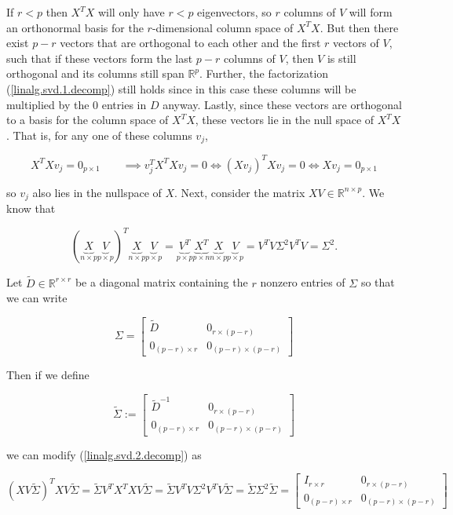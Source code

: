 If \(r < p\) then \(X^TX\) will only have \(r < p\) eigenvectors, so \(r\) columns of \(V\) will form an orthonormal basis for the \(r\)-dimensional column space of \(X^TX\). But then there exist \(p - r\) vectors that are orthogonal to each other and the first \(r\) vectors of \(V\), such that if these vectors form the last \(p-r\) columns of \(V\), then \(V\) is still orthogonal and its columns still span \(\mathbb{R}^p\). Further, the factorization (\ref{linalg.svd.1.decomp}) still holds since in this case these columns will be multiplied by the 0 entries in \(D\) anyway. Lastly, since these vectors are orthogonal to a basis for the column space of \(X^TX\), these vectors lie in the null space of \(X^TX\). That is, for any one of these columns \(v_j\),

\[
X^TX v_j = 0_{p \times 1} \qquad \implies v_j^T X^T X v_j = 0  \iff (X v_j )^T Xv _j = 0 \iff Xv _j  = 0_{p \times 1} 
\]

so \(v_j\) also lies in the nullspace of \(X\). Next, consider the matrix \(XV \in \mathbb{R}^{n \times p}\). We know that

\begin{equation}\label{linalg.svd.2.decomp}
(\underbrace{X}_{n \times p} \underbrace{V}_{p \times p})^T \underbrace{X}_{n \times p} \underbrace{V}_{p \times p} = \underbrace{V^T}_{p \times p} \underbrace{X^T}_{p \times n}  \underbrace{X}_{n \times p} \underbrace{V}_{p \times p} =  V^T V \Sigma^2 V^TV = \Sigma^2.
\end{equation}

Let \(\tilde{D} \in \mathbb{R}^{r \times r} \) be a diagonal matrix containing the \(r\) nonzero entries of \(\Sigma\) so that we can write

\[
\Sigma = \begin{bmatrix} 
\tilde{D} & 0_{r \times (p - r)} \\
0_{(p-r) \times r}  & 0_{(p-r) \times (p-r)}
\end{bmatrix}
\]

Then if we define

\[
\tilde{\Sigma} :=  \begin{bmatrix} 
\tilde{D}^{-1} & 0_{r \times (p - r)} \\
0_{(p-r) \times r}  & 0_{(p-r) \times (p-r)}
\end{bmatrix}
\]

we can modify (\ref{linalg.svd.2.decomp}) as

\begin{equation}\label{linalg.svd.3.decomp}
(XV \tilde{\Sigma})^T XV \tilde{\Sigma} =  \tilde{\Sigma} V^T X^TXV \tilde{\Sigma} = \tilde{\Sigma}  V^T V \Sigma^2 V^TV \tilde{\Sigma} = \tilde{\Sigma} \Sigma^2 \tilde{\Sigma} =  \begin{bmatrix} 
I_{r \times r} & 0_{r \times (p - r)} \\
0_{(p-r) \times r}  & 0_{(p-r) \times (p-r)}
\end{bmatrix} 
\end{equation}

